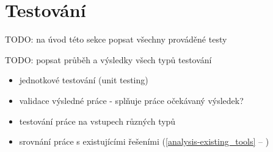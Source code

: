 \chapter{Testování}

TODO: na úvod této sekce popsat všechny prováděné testy

\noindent
TODO: popsat průběh a výsledky všech typů testování

\begin{itemize}
\item jednotkové testování (unit testing)
\item validace výsledné práce - splňuje práce očekávaný výsledek?
\item testování práce na vstupech různých typů
\item srovnání práce s existujícími řešeními (\ref{analysis-existing_tools} -- )
\end{itemize}
